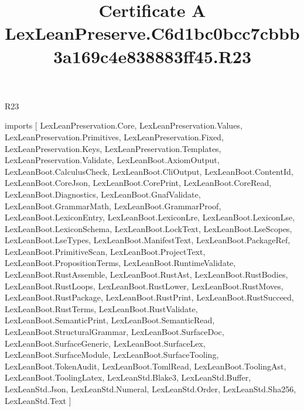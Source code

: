 \begin{lexlean}{R23}
\title{Certificate A LexLeanPreserve.C6d1bc0bcc7cbbb3a169c4e838883ff45.R23}
\begin{coremodule}
imports [
  LexLeanPreservation.Core,
  LexLeanPreservation.Values,
  LexLeanPreservation.Primitives,
  LexLeanPreservation.Fixed,
  LexLeanPreservation.Keys,
  LexLeanPreservation.Templates,
  LexLeanPreservation.Validate,
  LexLeanBoot.AxiomOutput,
  LexLeanBoot.CalculusCheck,
  LexLeanBoot.CliOutput,
  LexLeanBoot.ContentId,
  LexLeanBoot.CoreJson,
  LexLeanBoot.CorePrint,
  LexLeanBoot.CoreRead,
  LexLeanBoot.Diagnostics,
  LexLeanBoot.GnafValidate,
  LexLeanBoot.GrammarMath,
  LexLeanBoot.GrammarProof,
  LexLeanBoot.LexiconEntry,
  LexLeanBoot.LexiconLre,
  LexLeanBoot.LexiconLse,
  LexLeanBoot.LexiconSchema,
  LexLeanBoot.LockText,
  LexLeanBoot.LseScopes,
  LexLeanBoot.LseTypes,
  LexLeanBoot.ManifestText,
  LexLeanBoot.PackageRef,
  LexLeanBoot.PrimitiveScan,
  LexLeanBoot.ProjectText,
  LexLeanBoot.PropositionTerms,
  LexLeanBoot.RuntimeValidate,
  LexLeanBoot.RustAssemble,
  LexLeanBoot.RustAst,
  LexLeanBoot.RustBodies,
  LexLeanBoot.RustLoops,
  LexLeanBoot.RustLower,
  LexLeanBoot.RustMoves,
  LexLeanBoot.RustPackage,
  LexLeanBoot.RustPrint,
  LexLeanBoot.RustSucceed,
  LexLeanBoot.RustTerms,
  LexLeanBoot.RustValidate,
  LexLeanBoot.SemanticPrint,
  LexLeanBoot.SemanticRead,
  LexLeanBoot.StructuralGrammar,
  LexLeanBoot.SurfaceDoc,
  LexLeanBoot.SurfaceGeneric,
  LexLeanBoot.SurfaceLex,
  LexLeanBoot.SurfaceModule,
  LexLeanBoot.SurfaceTooling,
  LexLeanBoot.TokenAudit,
  LexLeanBoot.TomlRead,
  LexLeanBoot.ToolingAst,
  LexLeanBoot.ToolingLatex,
  LexLeanStd.Blake3,
  LexLeanStd.Buffer,
  LexLeanStd.Json,
  LexLeanStd.Numeral,
  LexLeanStd.Order,
  LexLeanStd.Sha256,
  LexLeanStd.Text
]


\end{coremodule}
\end{lexlean}
